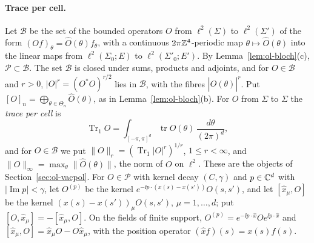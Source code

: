 \paragraph{Trace per cell.} Let $\mathscr B$ be the set of the bounded operators $O$ from $\ell^2(\Sigma)$ to $\ell^2(\Sigma')$ of the form $(Of)_\theta=\hat O(\theta)f_\theta$, with a continuous $2\pi\mathbb Z^4$-periodic map $\theta\mapsto\hat O(\theta)$ into the linear maps from $\ell^2(\Sigma_0;E)$ to $\ell^2(\Sigma'_0;E')$. By Lemma~\ref{lem:ol-bloch}(c), $\mathscr P\subset\mathscr B$. The set $\mathscr B$ is closed under sums, products and adjoints, and for $O\in\mathscr B$ and $r>0$, $|O|^r=(O^*O)^{r/2}$ lies in $\mathscr B$, with the fibres $|\hat O(\theta)|^r$. Put $[O]_n=\bigoplus_{\theta\in\Theta_n}\hat O(\theta)$, as in Lemma~\ref{lem:ol-bloch}(b). For $O$ from $\Sigma$ to $\Sigma$ the \emph{trace per cell} is
\[
\operatorname{Tr}_1O=\int_{[-\pi,\pi]^d}\operatorname{tr}\hat O(\theta)\,\frac{d\theta}{(2\pi)^d},
\]
and for $O\in\mathscr B$ we put $\|O\|_r=(\operatorname{Tr}_1|O|^r)^{1/r}$, $1\le r<\infty$, and $\|O\|_\infty=\max_\theta\|\hat O(\theta)\|$, the norm of $O$ on $\ell^2$. These are the objects of Section~\ref{sec:ol-vacpol}. For $O\in\mathscr P$ with kernel decay $(C,\gamma)$ and $p\in\mathbb C^d$ with $|\operatorname{Im}p|<\gamma$, let $O^{(p)}$ be the kernel $e^{-\ii p\cdot(x(s)-x(s'))}O(s,s')$, and let $[\hat x_\mu,O]$ be the kernel $(x(s)-x(s'))_\mu O(s,s')$, $\mu=1,\dots,d$; put $[O,\hat x_\mu]=-[\hat x_\mu,O]$. On the fields of finite support, $O^{(p)}=e^{-\ii p\cdot\hat x}Oe^{\ii p\cdot\hat x}$ and $[\hat x_\mu,O]=\hat x_\mu O-O\hat x_\mu$, with the position operator $(\hat xf)(s)=x(s)f(s)$.

